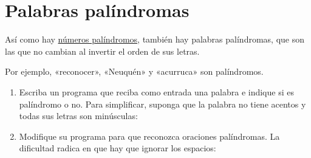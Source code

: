 \section{Palabras palíndromas}

Así como hay \href{es-numero-palindromo.html}{números palíndromos},
también hay palabras palíndromas, que son las que no cambian al invertir
el orden de sus letras.

Por ejemplo, «reconocer», «Neuquén» y «acurruca» son palíndromos.

\begin{enumerate}[1.]
\item
  Escriba un programa que reciba como entrada una palabra e indique si
  es palíndromo o no. Para simplificar, suponga que la palabra no tiene
  acentos y todas sus letras son minúsculas:
\item
  Modifique su programa para que reconozca oraciones palíndromas. La
  dificultad radica en que hay que ignorar los espacios:
\end{enumerate}
